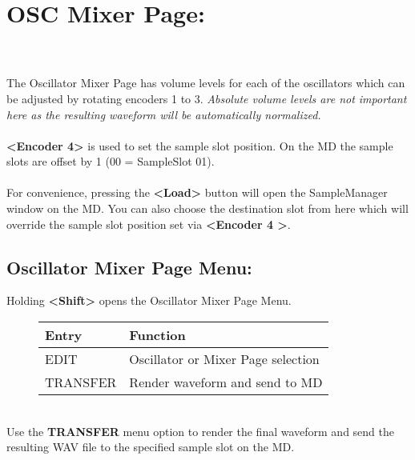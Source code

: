 \section{OSC Mixer Page:}
\\\\
The Oscillator Mixer Page has volume levels for each of the oscillators which can be adjusted by rotating encoders 1 to 3. \textit{Absolute volume levels are not important here as the resulting waveform will be automatically normalized.}\\
\\\textbf{<Encoder 4>} is used to set the sample slot position. On the MD the sample slots are offset by 1 (00 = SampleSlot 01).\\
\\
For convenience, pressing the \textbf{<Load>} button will open the SampleManager window on the MD. You can also choose the destination slot from here which will override the sample slot position set via \textbf{<Encoder 4 >}.

\newpage
\subsection{Oscillator Mixer Page Menu:}
Holding \textbf{<Shift>} opens the Oscillator Mixer Page Menu.
\begin{figure}[hb]
    \begin{tabular}{|l|l|}
    \hline
    \rowcolor[HTML]{C0C0C0}
    Entry     & Function \\ \hline
    EDIT      & Oscillator or Mixer Page selection \\ \hline
    TRANSFER  & Render waveform and send to MD\\ \hline
    \end{tabular}
\end{figure}
\\
Use the \textbf{TRANSFER} menu option to render the final waveform and send the resulting WAV file to the specified sample slot on the MD.
